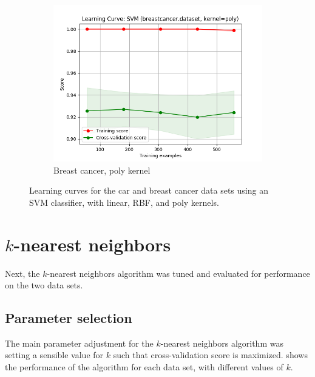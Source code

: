 \documentclass{article}
\begin{document}
\begin{figure}[htb]
\begin{subfigure}{0.33\textwidth}
      \includegraphics[width=\linewidth]{out/svm/breastcancer-kernel-poly.png}
      \caption{Breast cancer, poly kernel}
      \label{fig:svm-learning-6}
    \end{subfigure}

    \caption{Learning curves for the car and breast cancer data sets using an SVM classifier, with linear, RBF, and poly kernels.}
    \label{fig:svm-learning}
    \end{figure}

    \section{$k$-nearest neighbors}
    Next, the $k$-nearest neighbors algorithm was tuned and evaluated for performance on the two data sets.

    \subsection{Parameter selection}
    The main parameter adjustment for the $k$-nearest neighbors algorithm was setting a sensible value for $k$ such that cross-validation score is maximized.  shows the performance of the algorithm for each data set, with different values of $k$.
\end{document}
